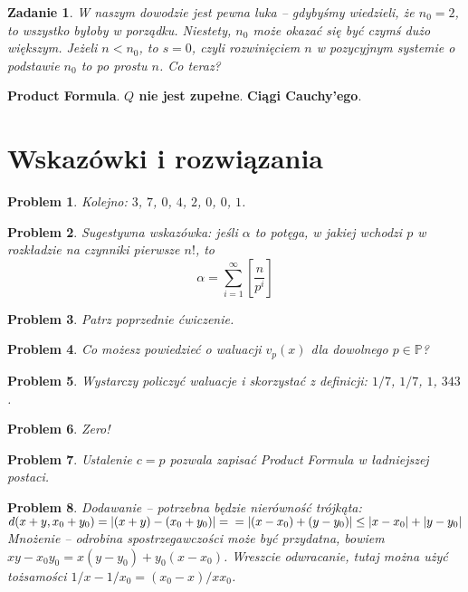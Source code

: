 \documentclass[a4paper,fleqn]{article}
\newtheorem{prbh}{Zadanie}
\newtheorem{sol}{Problem}
\begin{document}
\begin{multicols}{2}
\begin{prbh}W naszym dowodzie jest pewna luka -- gdybyśmy wiedzieli, że $n_0 = 2$, to wszystko byłoby w porządku. Niestety, $n_0$ może okazać się być czymś dużo większym. Jeżeli $n < n_0$, to $s = 0$, czyli rozwinięciem $n$ w pozycyjnym systemie o podstawie $n_0$ to po prostu $n$. Co teraz?\end{prbh}
\textbf{Product Formula}. \textbf{$Q$ nie jest zupełne}. \textbf{Ciągi Cauchy'ego}.
\end{multicols}
{}



\newpage
\section*{Wskazówki i rozwiązania}

\begin{sol}Kolejno: $3$, $7$, $0$, $4$, $2$, $0$, $0$, $1$.\end{sol}
\begin{sol}Sugestywna wskazówka: jeśli $\alpha$ to potęga, w jakiej wchodzi $p$ w rozkładzie na czynniki pierwsze $n!$, to\[\alpha = \sum_{i=1}^{\infty} \left[\frac{n}{p^i}\right]\]\end{sol}
\begin{sol}Patrz poprzednie ćwiczenie.\end{sol}
\begin{sol}Co możesz powiedzieć o waluacji $v_p(x)$ dla dowolnego $p\in\mathbb P$?\end{sol}
\begin{sol}Wystarczy policzyć waluacje i skorzystać z definicji: $1/7$, $1/7$, $1$, $343$.\end{sol}
\begin{sol}Zero!\end{sol}
\begin{sol}Ustalenie $c=p$ pozwala zapisać Product Formula w ładniejszej postaci.\end{sol}

\begin{sol}Dodawanie -- potrzebna będzie nierówność trójkąta:
$d(x+y, x_0 + y_0) = |(x+y) -(x_0+y_0) | =\\=  |(x-x_0)+ (y-y_0)| \le |x-x_0| + |y-y_0|$
Mnożenie -- odrobina spostrzegawczości może być przydatna, bowiem $xy - x_0y_0 = x(y-y_0) + y_0(x-x_0)$. Wreszcie odwracanie, tutaj można użyć tożsamości $1/x - 1/{x_0} = {(x_0-x)}/{xx_0}$.\end{sol}
\end{document}
